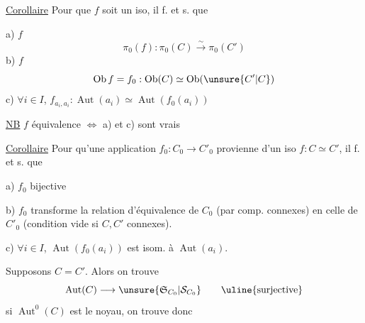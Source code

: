 \uline{Corollaire} Pour que $f$ soit un iso, il f. et s. que

a) $f$ 
\[\pi_0(f):\pi_0(C)\overset{\sim}{\longrightarrow}\pi_0(C')\]
b) $f$ 
\[\operatorname{Ob}f=f_0:\operatorname{Ob}(C)\simeq\operatorname{Ob}(\unsure{C'|C})\]
c) $\forall i\in I$, $f_{a_i,a_i}:\operatorname{Aut}(a_i)\simeq\operatorname{Aut}(f_0(a_i))$

\uline{NB} $f$ équivalence $\Longleftrightarrow$ a) et c) sont vrais

\uline{Corollaire} Pour qu'une application
$f_0:C_0\longrightarrow C'_0$ provienne d'un
iso $f:C\simeq C'$, il f. et s. que

a) $f_0$  bijective

b) $f_0$ transforme la relation d'équivalence de $C_0$ (par comp. connexes)
en celle de $C'_0$ (condition vide si $C,C'$ connexes).

c) $\forall i\in I$, $\operatorname{Aut}(f_0(a_i))$ est isom. à $\operatorname{Aut}(a_i)$.

 Supposons $C=C'$. Alors on trouve
\[\operatorname{Aut}(C)\longrightarrow\unsure{\mathfrak{S}_{C_0}|\mathcal{S}_{C_0}}\qquad\uline{\text{surjective}}\]
si $\operatorname{Aut}^0(C)$ est le noyau, on trouve donc
